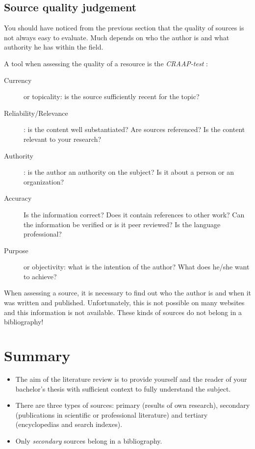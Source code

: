 \subsection{Source quality judgement}
\label{sub:sourcequalityjudgement}

You should have noticed from the previous section that the quality of sources is not always easy to evaluate. Much depends on who the author is and what authority he has within the field.

A tool when assessing the quality of a resource is the \emph{CRAAP-test} \autocite{Blakeslee2004}:

\begin{description}
   \item[Currency] or topicality: is the source sufficiently recent for the topic?
      \item[Reliability/Relevance]: is the content well substantiated? Are sources referenced? Is the content relevant to your research?
      \item[Authority]: is the author an authority on the subject? Is it about a person or an organization?
      \item[Accuracy] Is the information correct? Does it contain references to other work? 
      Can the information be verified or is it peer reviewed? Is the language professional?
   \item[Purpose] or objectivity: what is the intention of the author? What does he/she want to achieve?
\end{description}

When assessing a source, it is necessary to find out who the author is and when it was written and published. Unfortunately, this is not possible on many websites and this information is not available. These kinds of sources do not belong in a bibliography!

\section{Summary}
\label{sec:literatureresearchsummary}

\begin{itemize}
   \item The aim of the literature review is to provide yourself and the reader of your bachelor's thesis with sufficient context to fully understand the subject.
   \item There are three types of sources: primary (results of own research), secondary (publications in scientific or professional literature) and tertiary (encyclopedias and search indexes).
   \item Only \emph{secondary} sources belong in a bibliography.
\end{itemize}
